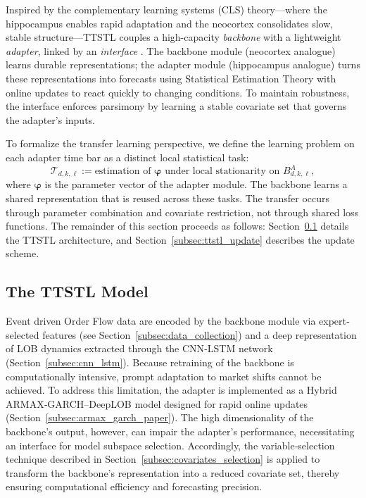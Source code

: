 \documentclass{rQUF2e}
\theoremstyle{plain}
\theoremstyle{definition}
\theoremstyle{remark}
\begin{document}
Inspired by the complementary learning systems (CLS) theory—where the hippocampus enables rapid adaptation and the neocortex consolidates slow, stable structure—TTSTL couples a high-capacity \emph{backbone} with a lightweight \emph{adapter}, linked by an \emph{interface} \citep{pham_continual_2024}. The backbone module (neocortex analogue) learns durable representations; the adapter module (hippocampus analogue) turns these representations into forecasts using Statistical Estimation Theory with online updates to react quickly to changing conditions. To maintain robustness, the interface enforces parsimony by learning a stable covariate set that governs the adapter’s inputs.

To formalize the transfer learning perspective, we define the learning problem on each adapter time bar as a distinct local statistical task:
\[
\mathcal{T}_{d,k,\ell} := \text{estimation of } \boldsymbol{\varphi} \text{ under local stationarity on } B^A_{d,k,\ell},
\]
where $\boldsymbol{\varphi}$ is the parameter vector of the adapter module. The backbone learns a shared representation that is reused across these tasks. The transfer occurs through parameter combination and covariate restriction, not through shared loss functions. The remainder of this section proceeds as follows: Section~\ref{subsec:ttstl_model} details the TTSTL architecture, and Section~\ref{subsec:ttstl_update} describes the update scheme.

\subsection{The TTSTL Model}
\label{subsec:ttstl_model}

Event driven Order Flow data are encoded by the backbone module via expert‐selected features (see Section~\ref{subsec:data_collection}) and a deep representation of LOB dynamics extracted through the CNN‐LSTM network (Section~\ref{subsec:cnn_lstm}).  Because retraining of the backbone is computationally intensive, prompt adaptation to market shifts cannot be achieved.  To address this limitation, the adapter is implemented as a Hybrid ARMAX‐GARCH–DeepLOB model designed for rapid online updates (Section~\ref{subsec:armax_garch_paper}).  The high dimensionality of the backbone’s output, however, can impair the adapter’s performance, necessitating an interface for model subspace selection.  Accordingly, the variable‐selection technique described in Section~\ref{subsec:covariates_selection} is applied to transform the backbone’s representation into a reduced covariate set, thereby ensuring computational efficiency and forecasting precision.
\end{document}

